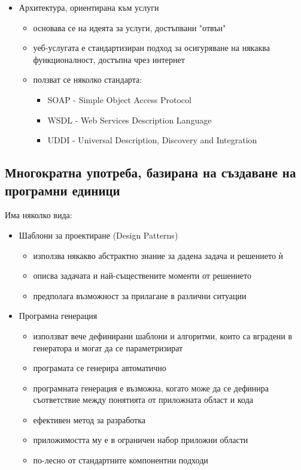 \documentclass[fleqn,12pt]{article}
\begin{document}
\begin{itemize}
\begin{itemize}
	\end{itemize}
	\item Архитектура, ориентирана към услуги
	\begin{itemize}
		\item основава се на идеята за услуги, достъпвани "отвън"
		\item уеб-услугата е стандартизиран подход за осигуряване на някаква функционалност, достъпна чрез интернет
		\item ползват се няколко стандарта:
		\begin{itemize}
			\item SOAP - Simple Object Access Protocol
			\item WSDL - Web Services Description Language
			\item UDDI - Universal Description, Discovery and Integration
		\end{itemize}
	\end{itemize}
\end{itemize}

\subsection{Многократна употреба, базирана на създаване на програмни единици}

Има няколко вида:
\begin{itemize}
	\item Шаблони за проектиране (Design Patterns)
	\begin{itemize}
		\item използва някакво абстрактно знание за дадена задача и решението ѝ
		\item описва задачата и най-съществените моменти от решението
		\item предполага възможност за прилагане в различни ситуации
	\end{itemize}
	\item Програмна генерация
	\begin{itemize}
		\item използват вече дефинирани шаблони и алгоритми, които са вградени в генератора и могат да се параметризират
		\item програмата се генерира автоматично
		\item програмната генерация е възможна, когато може да се дефинира съответствие между понятията от приложната област и кода
		\item ефективен метод за разработка
		\item приложимостта му е в ограничен набор приложни области
		\item по-лесно от стандартните компонентни подходи
	\end{itemize}
\end{itemize}
\end{document}
